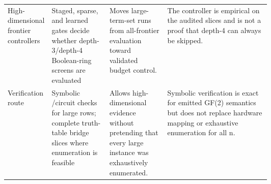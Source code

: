 \begin{tabularx}{\linewidth}{>{\raggedright\arraybackslash}p{0.16\linewidth}>{\raggedright\arraybackslash}p{0.22\linewidth}>{\raggedright\arraybackslash}p{0.22\linewidth}>{\raggedright\arraybackslash}X}
High-dimensional frontier controllers & Staged, sparse, and learned gates decide whether depth-3/depth-4 Boolean-ring screens are evaluated & Moves large-term-set runs from all-frontier evaluation toward validated budget control. & The controller is empirical on the audited slices and is not a proof that depth-4 can always be skipped. \\
Verification route & Symbolic \anf{}/circuit checks for large rows; complete truth-table bridge slices where enumeration is feasible & Allows high-dimensional evidence without pretending that every large instance was exhaustively enumerated. & Symbolic verification is exact for emitted GF(2) semantics but does not replace hardware mapping or exhaustive enumeration for all n. \\
\bottomrule
\end{tabularx}
